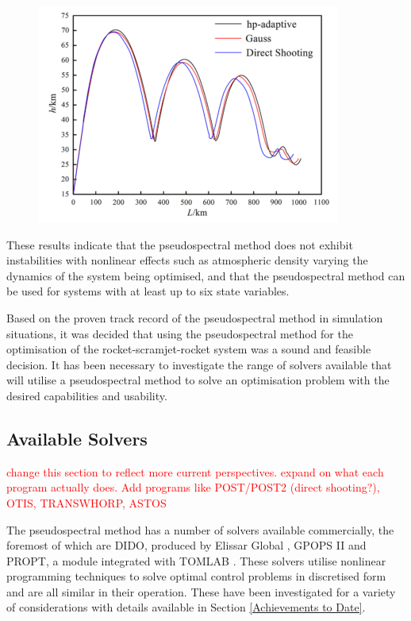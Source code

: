  \begin{figure}
\centering
\includegraphics[width=0.7\linewidth]{figures/2_literature-review/OptimisationMethodComparisonChai}
\caption{}
\label{fig:OptimisationMethodComparisonChai}
\end{figure}


These results indicate that the pseudospectral method does not exhibit instabilities with nonlinear effects such as atmospheric density varying the dynamics of the system being optimised, and that the pseudospectral method can be used for systems with at least up to six state variables.

Based on the proven track record of the pseudospectral method in simulation situations, it was decided that using the pseudospectral method for the optimisation of the rocket-scramjet-rocket system was a sound and feasible decision. It has been necessary to investigate the range of solvers available that will utilise a pseudospectral method to solve an optimisation problem with the desired capabilities and usability. 

\subsection{Available Solvers}
\textcolor{red}{change this section to reflect more current perspectives.
expand on what each program actually does. Add programs like POST/POST2 (direct shooting?), OTIS, TRANSWHORP, ASTOS}

The pseudospectral method has a number of solvers available commercially, the foremost of which are DIDO, produced by Elissar Global \cite{Ross2002}, GPOPS II \cite{Rao2010} and PROPT, a module integrated with TOMLAB \cite{Rutquist2010}. These solvers utilise nonlinear programming techniques to solve optimal control problems in discretised form and are all similar in their operation. These have been investigated for a variety of considerations with details available in Section \ref{Achievements to Date}. 

